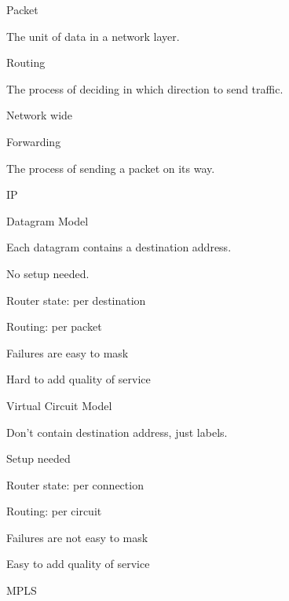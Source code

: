 \documentclass[main.tex]{subfiles}
\begin{document}
\small


\begin{card}{Packet}
\item The unit of data in a network layer.
\end{card}

\begin{card}{Routing}
\item The process of deciding in which direction to send traffic.
\item Network wide
\end{card}

\begin{card}{Forwarding}
\item The process of sending a packet on its way.
\end{card}

\begin{card}{IP}
\TODO
\end{card}

\begin{card}{Datagram Model}
\item Each datagram contains a destination address.
\item No setup needed.
\item Router state: per destination
\item Routing: per packet
\item Failures are easy to mask
\item Hard to add quality of service
\end{card}

\begin{card}{Virtual Circuit Model}
\item Don't contain destination address, just labels.
\item Setup needed
\item Router state: per connection
\item Routing: per circuit
\item Failures are not easy to mask
\item Easy to add quality of service
\end{card}

\begin{card}{MPLS}
\TODO
\end{card}
\end{document}
